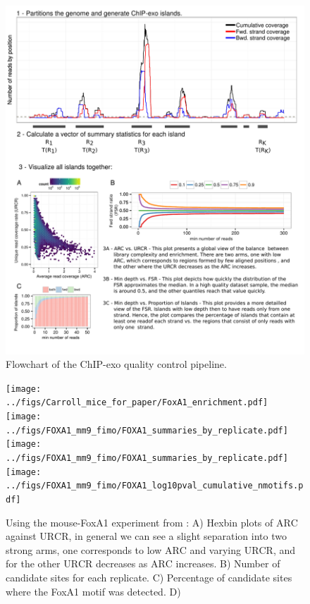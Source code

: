 \documentclass{bmcart}\usepackage[]{graphicx}\usepackage[]{color}
\begin{document}
\newpage

\begin{figure}[h!]
  \centering
  \centering
  \includegraphics[width = \textwidth]{../figs/for_paper/coverage_diagram2.pdf}
  \caption{Flowchart of the ChIP-exo quality control pipeline.}
  \label{fig:qcdiagram}
\end{figure}

\newpage

\begin{figure}[h!]
  \centering
  \texttt{[image: ../figs/Carroll\_mice\_for\_paper/FoxA1\_enrichment.pdf]}
  \newline
  \texttt{[image: ../figs/FOXA1\_mm9\_fimo/FOXA1\_summaries\_by\_replicate.pdf]}
  \texttt{[image: ../figs/FOXA1\_mm9\_fimo/FOXA1\_summaries\_by\_replicate.pdf]}
  \texttt{[image: ../figs/FOXA1\_mm9\_fimo/FOXA1\_log10pval\_cumulative\_nmotifs.pdf]}
  \caption{Using the mouse-FoxA1 experiment from \cite{exoillumina}:
    A) Hexbin plots of $\mbox{ARC}$ against $\mbox{URCR}$, in general
    we can see a slight separation into two strong arms, one
    corresponds to low $\mbox{ARC}$ and varying $\mbox{URCR}$, and for
    the other $\mbox{URCR}$ decreases as $\mbox{ARC}$ increases. B)
    Number of candidate sites for each replicate. C) Percentage of
    candidate sites where the FoxA1 motif was detected. D) 
 }
  \label{fig:enrich}
\end{figure}
\end{document}
